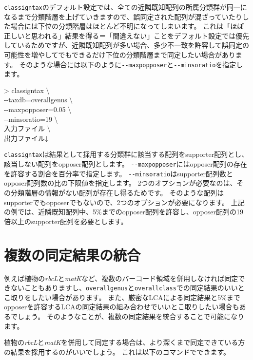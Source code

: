 \documentclass[titlepage,10pt,a4paper]{jsbook}
\newenvironment{cmd}{\begin{oframed}\raggedright\ttfamily\footnotesize\setlength{\baselineskip}{1.4em}}{\end{oframed}\vspace{-1em}}
\begin{document}
\texttt{classigntax}のデフォルト設定では、全ての近隣既知配列の所属分類群が同一になるまで分類階層を上げていきますので、誤同定された配列が混ざっていたりした場合には下位の分類階層はほとんど不明になってしまいます。
これは「ほぼ正しいと思われる」結果を得る＝「間違えない」ことをデフォルト設定では優先しているためですが、近隣既知配列が多い場合、多少不一致を許容して誤同定の可能性を増やしてでもできるだけ下位の分類階層まで同定したい場合があります。
そのような場合には以下のように\texttt{{-}{-}maxpopposer}と\texttt{{-}{-}minsoratio}を指定します。

\begin{cmd}
{\textgreater} classigntax {\textbackslash}\\
{-}{-}taxdb=overall{\textunderscore}genus {\textbackslash}\\
{-}{-}maxpopposer=0.05 {\textbackslash}\\
{-}{-}minsoratio=19 {\textbackslash}\\
入力ファイル {\textbackslash}\\
出力ファイル↓
\end{cmd}

\texttt{classigntax}は結果として採用する分類群に該当する配列をsupporter配列とし、該当しない配列をopposer配列とします。
\texttt{{-}{-}maxpopposer}にはopposer配列の存在を許容する割合を百分率で指定します。
\texttt{{-}{-}minsoratio}はsupporter配列数とopposer配列数の比の下限値を指定します。
2つのオプションが必要なのは、その分類階層の情報がない配列が存在し得るためです。
そのような配列はsupporterでもopposerでもないので、2つのオプションが必要になります。
上記の例では、近隣既知配列中、5\%までのopposer配列を許容し、opposer配列の19倍以上のsupporter配列を必要とします。

\section{複数の同定結果の統合}\label{section:mergingmultipleassignment}

例えば植物の\textit{rbcL}と\textit{matK}など、複数のバーコード領域を併用しなければ同定できないこともありますし、\texttt{overall{\textunderscore}genus}と\texttt{overall{\textunderscore}class}での同定結果のいいとこ取りをしたい場合があります。
また、厳密なLCAによる同定結果と5\%までopposerを許容するLCAの同定結果の組み合わせでいいとこ取りしたい場合もあるでしょう。
そのようなことが、複数の同定結果を統合することで可能になります。

植物の\textit{rbcL}と\textit{matK}を併用して同定する場合は、より深くまで同定できている方の結果を採用するのがいいでしょう。
これは以下のコマンドでできます。
\end{document}
